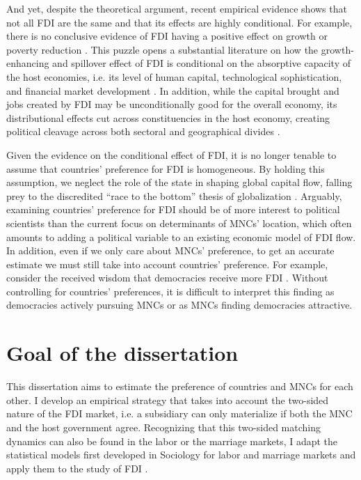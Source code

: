 And yet, despite the theoretical argument, recent empirical evidence shows that
not all FDI are the same and that its effects are highly conditional. For
example, there is no conclusive evidence of FDI having a positive effect on
growth \citep{Nair-Reichert2001, Carkovic2002} or poverty reduction
\citep{Guerra2009}. This puzzle opens a substantial literature on how the
growth-enhancing and spillover effect of FDI is conditional on the absorptive
capacity of the host economies, i.e. its level of human capital, technological
sophistication, and financial market development \citep{Durham2004,
  Nunnenkamp2004, Fu2008, Willem2004}. In addition, while the capital brought
and jobs created by FDI may be unconditionally good for the overall economy, its
distributional effects cut across constituencies in the host economy, creating
political cleavage across both sectoral and geographical divides
\citep{Chintrakarn2012, Goldberg2007, Nunnenkamp2007}.

Given the evidence on the conditional effect of FDI, it is no longer tenable to
assume that countries' preference for FDI is homogeneous. By holding this
assumption, we neglect the role of the state in shaping global capital flow,
falling prey to the discredited ``race to the bottom'' thesis of globalization
\citep{Mosley2005}. Arguably, examining countries' preference for FDI should be
of more interest to political scientists than the current focus on determinants
of MNCs' location, which often amounts to adding a political variable to an
existing economic model of FDI flow. In addition, even if we only care about
MNCs' preference, to get an accurate estimate we must still take into account
countries' preference. For example, consider the received wisdom that
democracies receive more FDI \citep{Jensen2008a}. Without controlling for
countries' preferences, it is difficult to interpret this finding as democracies
actively pursuing MNCs or as MNCs finding democracies attractive.

\section{Goal of the dissertation}

This dissertation aims to estimate the preference of countries and MNCs for each
other. I develop an empirical strategy that takes into account the two-sided
nature of the FDI market, i.e. a subsidiary can only materialize if both the MNC
and the host government agree. Recognizing that this two-sided matching dynamics
can also be found in the labor or the marriage markets, I adapt the statistical
models first developed in Sociology for labor and marriage markets and apply
them to the study of FDI \citep{Logan1996, Logan2008}.

